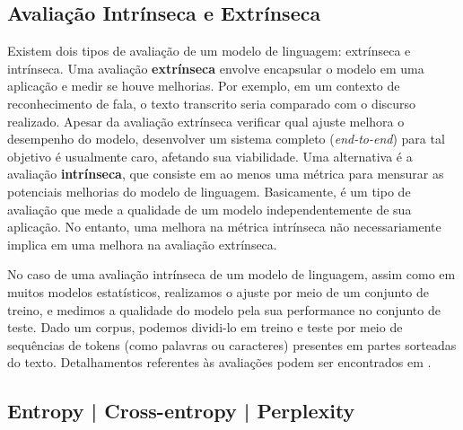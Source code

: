 \documentclass{automatextcc}
\begin{document}
\subsection{Avaliação Intrínseca e Extrínseca}
Existem dois tipos de avaliação de um modelo de linguagem: extrínseca e intrínseca. Uma avaliação \textbf{extrínseca} envolve encapsular o modelo em uma aplicação e medir se houve melhorias. Por exemplo, em um contexto de reconhecimento de fala, o texto transcrito seria comparado com o discurso realizado. Apesar da avaliação extrínseca verificar qual ajuste melhora o desempenho do modelo, desenvolver um sistema completo (\textit{end-to-end}) para tal objetivo é usualmente caro, afetando sua viabilidade. Uma alternativa é a avaliação \textbf{intrínseca}, que consiste em ao menos uma métrica para mensurar as potenciais melhorias do modelo de linguagem. Basicamente, é um tipo de avaliação que mede a qualidade de um modelo independentemente de sua aplicação. No entanto, uma melhora na métrica intrínseca não necessariamente implica em uma melhora na avaliação extrínseca. 

No caso de uma avaliação intrínseca de um modelo de linguagem, assim como em muitos modelos estatísticos, realizamos o ajuste por meio de um conjunto de treino, e medimos a qualidade do modelo pela sua performance no conjunto de teste. Dado um corpus, podemos dividi-lo em treino e teste por meio de sequências de tokens (como palavras ou caracteres) presentes em partes sorteadas do texto. Detalhamentos referentes às avaliações podem ser encontrados em \citet{goldberg2017, jurafsky2021}.


\subsection{Entropy | Cross-entropy | Perplexity}
\end{document}
